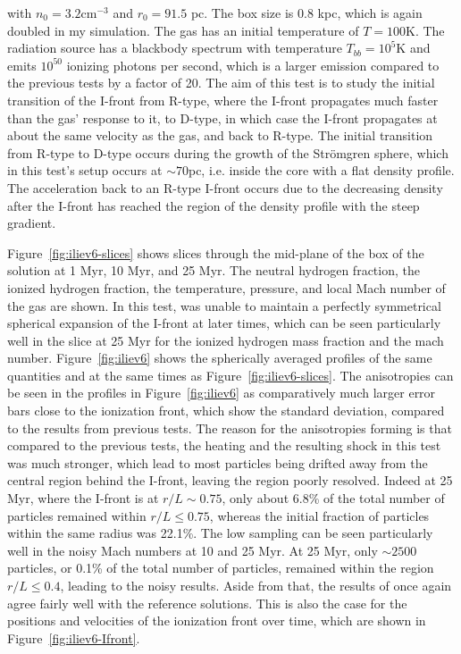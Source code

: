 with $n_0 = 3.2$cm$^{-3}$ and $r_0 = 91.5$ pc. The box size is 0.8 kpc, which is again doubled in
my simulation. The gas has an initial temperature of $T = 100$K. The radiation source has a
blackbody spectrum with temperature $T_{bb} = 10^5$K and emits $10^{50}$ ionizing photons per
second, which is a larger emission compared to the previous tests by a factor of 20. The aim of this
test is to study the initial transition of the I-front from R-type, where the I-front propagates
much faster than the gas' response to it, to D-type, in which case the I-front propagates at about
the same velocity as the gas, and back to R-type. The initial transition from R-type to D-type
occurs during the growth of the Str\"omgren sphere, which in this test's setup occurs at $\sim
70$pc, i.e. inside the core with a flat density profile. The acceleration back to an R-type I-front
occurs due to the decreasing density after the I-front has reached the region of the density profile
with the steep gradient.





Figure~\ref{fig:iliev6-slices} shows slices through the mid-plane of the box of the solution at 1
Myr, 10 Myr, and 25 Myr. The neutral hydrogen fraction, the ionized hydrogen fraction, the
temperature, pressure, and local Mach number of the gas are shown. In this test, \GEARRT was unable
to maintain a perfectly symmetrical spherical expansion of the I-front at later times, which can be
seen particularly well in the slice at 25 Myr for the ionized hydrogen mass fraction and the mach
number. Figure~\ref{fig:iliev6} shows the spherically averaged profiles of the same quantities and
at the same times as Figure~\ref{fig:iliev6-slices}. The anisotropies can be seen in the profiles in
Figure~\ref{fig:iliev6} as comparatively much larger error bars close to the ionization front,
which show the standard deviation, compared to the results from previous tests. The reason for the
anisotropies forming is that compared to the previous tests, the heating and the resulting shock in
this test was much stronger, which lead to most particles being drifted away from the central region
behind the I-front, leaving the region poorly resolved. Indeed at 25 Myr, where the I-front is at
$r/L \sim 0.75$, only about 6.8\% of the total number of particles remained within $r/L \leq 0.75$,
whereas the initial fraction of particles within the same radius was 22.1\%. The low sampling can be
seen particularly well in the noisy Mach numbers at 10 and 25 Myr. At 25 Myr, only $\sim 2500$
particles, or 0.1\% of the total number of particles, remained within the region $r/L \leq 0.4$,
leading to the noisy results. Aside from that, the results of \GEARRT once again agree fairly well
with the reference solutions. This is also the case for the positions and velocities of the
ionization front over time, which are shown in Figure~\ref{fig:iliev6-Ifront}.











